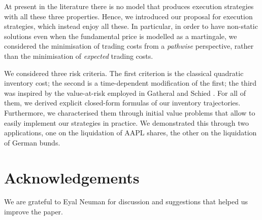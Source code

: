 \documentclass[10pt,a4paper]{article}
\begin{document}
At present in the literature there is no model that produces execution strategies with all these three properties. Hence, we introduced our proposal for execution strategies, which  instead enjoy all these. In particular, in order to have non-static solutions even when the fundamental price is modelled as a martingale, we considered the minimisation of  trading costs from a \emph{pathwise} perspective, rather than the minimisation of \emph{expected} trading costs. 

We considered three risk criteria. The first criterion is the classical quadratic inventory cost; the second is a time-dependent modification of the first; the third was inspired by the value-at-risk employed in Gatheral and Schied \cite{GS11opt}.  For all of them, we derived explicit closed-form formulas of our inventory trajectories. Furthermore, we characterised them through initial value problems that allow to easily implement our strategies in practice. We demonstrated this through two applications, one on the liquidation of AAPL shares, the other on the liquidation of German bunds.  


\section*{Acknowledgements}
We are grateful to Eyal Neuman for discussion and suggestions that helped us improve the paper.


	
	
	
	
\end{document}
